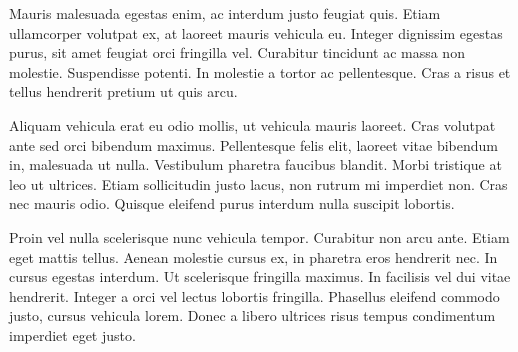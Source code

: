 \begin{agradecimentos}





 Mauris malesuada egestas enim, ac interdum justo feugiat quis. Etiam ullamcorper volutpat ex, at laoreet mauris vehicula eu. Integer dignissim egestas purus, sit amet feugiat orci fringilla vel. Curabitur tincidunt ac massa non molestie. Suspendisse potenti. In molestie a tortor ac pellentesque. Cras a risus et tellus hendrerit pretium ut quis arcu.

Aliquam vehicula erat eu odio mollis, ut vehicula mauris laoreet. Cras volutpat ante sed orci bibendum maximus. Pellentesque felis elit, laoreet vitae bibendum in, malesuada ut nulla. Vestibulum pharetra faucibus blandit. Morbi tristique at leo ut ultrices. Etiam sollicitudin justo lacus, non rutrum mi imperdiet non. Cras nec mauris odio. Quisque eleifend purus interdum nulla suscipit lobortis.

Proin vel nulla scelerisque nunc vehicula tempor. Curabitur non arcu ante. Etiam eget mattis tellus. Aenean molestie cursus ex, in pharetra eros hendrerit nec. In cursus egestas interdum. Ut scelerisque fringilla maximus. In facilisis vel dui vitae hendrerit. Integer a orci vel lectus lobortis fringilla. Phasellus eleifend commodo justo, cursus vehicula lorem. Donec a libero ultrices risus tempus condimentum imperdiet eget justo. 
    
    
\end{agradecimentos}

